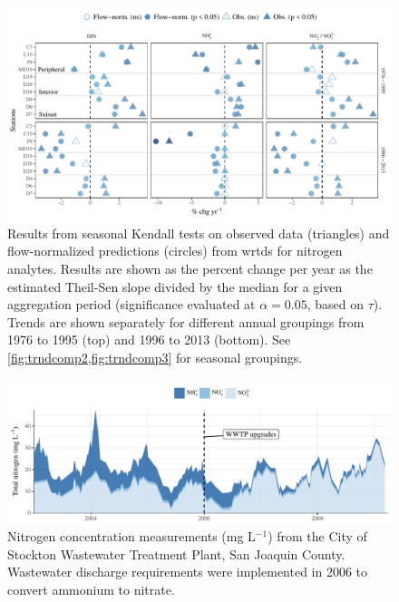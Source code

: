 \documentclass[letterpaper,12pt,oneside]{article}\usepackage[]{graphicx}\usepackage[]{color}
\begin{document}
\begin{figure}
\centering
\includegraphics[width=1\textwidth,page=1]{figs/trndcomp1.pdf}
\caption{Results from seasonal Kendall tests on observed data (triangles) and flow-normalized predictions (circles) from \ac{wrtds} for nitrogen analytes. Results are shown as the percent change per year as the estimated Theil-Sen slope divided by the median for a given aggregation period (significance evaluated at $\alpha = 0.05$, based on $\tau$). Trends are shown separately for different annual groupings from 1976 to 1995 (top) and 1996 to 2013 (bottom). See \cref{fig:trndcomp2,fig:trndcomp3} for seasonal groupings.}
\label{fig:trndcomp1}   
\end{figure}

\begin{figure}[!ht]

{\centering \includegraphics[width=\textwidth]{figs/stock-1} 

}

\caption[Nitrogen concentration measurements (mg L$^{-1}$) from the City of Stockton Wastewater Treatment Plant, San Joaquin County]{Nitrogen concentration measurements (mg L$^{-1}$) from the City of Stockton Wastewater Treatment Plant, San Joaquin County.  Wastewater discharge requirements were implemented in 2006 to convert ammonium to nitrate.}\label{fig:stock}
\end{figure}
\end{document}
